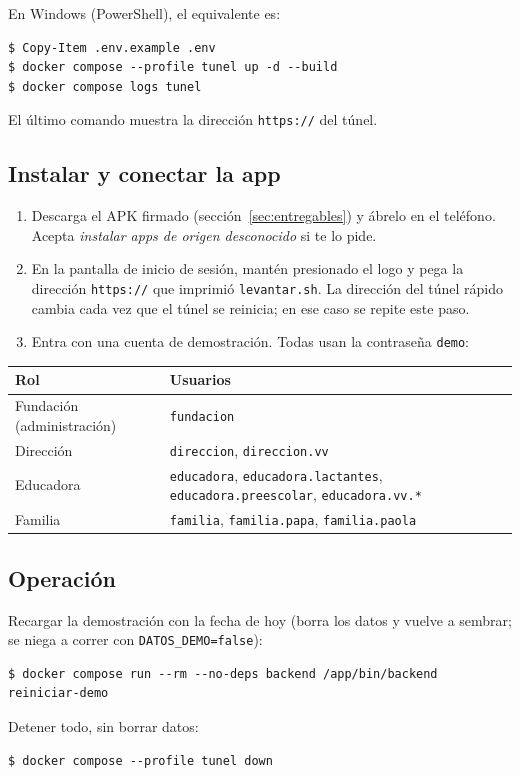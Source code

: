 En Windows (PowerShell), el equivalente es:
\begin{lstlisting}[style=terminal]
$ Copy-Item .env.example .env
$ docker compose --profile tunel up -d --build
$ docker compose logs tunel
\end{lstlisting}
El último comando muestra la dirección \texttt{https://} del túnel.

\subsection{Instalar y conectar la app}
\begin{enumerate}
	\item Descarga el APK firmado (sección~\ref{sec:entregables}) y ábrelo en el teléfono. Acepta \emph{instalar apps de origen desconocido} si te lo pide.
	\item En la pantalla de inicio de sesión, mantén presionado el logo y pega la dirección \texttt{https://} que imprimió \texttt{levantar.sh}. La dirección del túnel rápido cambia cada vez que el túnel se reinicia; en ese caso se repite este paso.
	\item Entra con una cuenta de demostración. Todas usan la contraseña \texttt{demo}:
\end{enumerate}

\begin{center}\small
\begin{tabular}{ll}
\toprule
\textbf{Rol} & \textbf{Usuarios}\\\midrule
Fundación (administración) & \texttt{fundacion}\\
Dirección & \texttt{direccion}, \texttt{direccion.vv}\\
Educadora & \texttt{educadora}, \texttt{educadora.lactantes}, \texttt{educadora.preescolar}, \texttt{educadora.vv.*}\\
Familia & \texttt{familia}, \texttt{familia.papa}, \texttt{familia.paola}\\
\bottomrule
\end{tabular}
\end{center}

\subsection{Operación}
Recargar la demostración con la fecha de hoy (borra los datos y vuelve a sembrar; se niega a correr con \texttt{DATOS\_DEMO=false}):
\begin{lstlisting}[style=terminal]
$ docker compose run --rm --no-deps backend /app/bin/backend reiniciar-demo
\end{lstlisting}
Detener todo, sin borrar datos:
\begin{lstlisting}[style=terminal]
$ docker compose --profile tunel down
\end{lstlisting}

